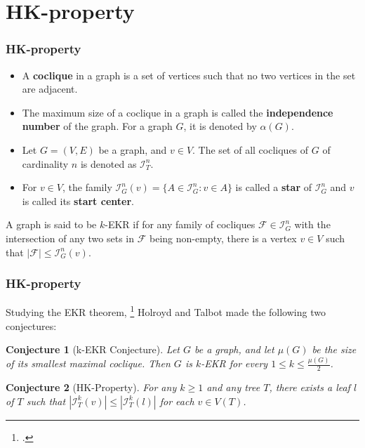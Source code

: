 \documentclass[10pt,]{beamer}
\theoremstyle{conjectureStyle}
\newtheorem*{conjecture}{Conjecture}
\theoremstyle{notationStyle}
\theoremstyle{claimStyle}
\begin{document}
\section{HK-property}
\begin{frame}\frametitle{HK-property}
    \begin{definition}[Cocliques]
        \begin{itemize}
            \item A \textbf{coclique} in a graph is a set of vertices such that no two vertices in the set are adjacent.
            \item The maximum size of a coclique in a graph is called the \textbf{independence number} of the graph. For a graph $G$, it is denoted by $\alpha(G)$.
        \end{itemize}
    \end{definition}
    \pause

    \begin{definition}
        \begin{itemize}
            \item Let $G = (V, E)$ be a graph, and $v \in V$. The set of all cocliques of $G$ of cardinality $n$ is denoted as $\mathcal{I}^n_T$.
            \item For $v \in V$, the family $\mathcal{I}^n_G(v) = \{A \in \mathcal{I}^n_G : v \in A\}$ is called a \textbf{star} of $\mathcal{I}^n_G$ and $v$ is called its \textbf{start center}.
        \end{itemize}
    \end{definition}
    \pause

    \begin{definition}
        A graph is said to be $k$-EKR if for any family of cocliques $\mathcal{F} \in \mathcal{I}^n_G$ with the intersection of any two sets in $\mathcal{F}$ being non-empty, there is a vertex $v \in V$ such that $|\mathcal{F}| \leq \mathcal{I}^n_G(v)$.
    \end{definition}
\end{frame}

\begin{frame}\frametitle{HK-property}
    Studying the EKR theorem, \footcite{HOLROYD2005165} Holroyd and Talbot made the following two conjectures:
    \begin{conjecture}[k-EKR Conjecture]
        Let $G$ be a graph, and let $\mu(G)$ be the size of its smallest maximal coclique. Then $G$ is $k$-EKR for every $1 \leq k \leq \frac{\mu(G)}{2}$.
    \end{conjecture}
    \pause
    \begin{conjecture}[HK-Property]
        For any $k \geq 1$ and any tree $T$, there exists a leaf $l$ of $T$ such that $|\mathcal{I}^k_T(v)| \leq |\mathcal{I}^k_T(l)|$ for each $v \in V(T)$.
    \end{conjecture}
\end{frame}
\end{document}
